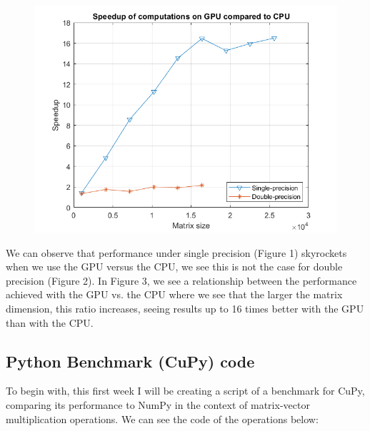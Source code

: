 \begin{center}
\begin{figure}[H]
\begin{minipage}[b]{0.32\linewidth}
\includegraphics[width=\linewidth]{Figures/Imagenes/speedup.png}
\caption{}
\end{minipage}
\end{figure}
\end{center}

\vspace{-1em}

We can observe that performance under single precision (Figure 1) skyrockets when we use the GPU versus the CPU, we see this is not the case for double precision (Figure 2). In Figure 3, we see a relationship between the performance achieved with the GPU vs. the CPU where we see that the larger the matrix dimension, this ratio increases, seeing results up to 16 times better with the GPU than with the CPU.



\subsection{Python Benchmark (CuPy) code}

To begin with, this first week I will be creating a script of a benchmark for CuPy, comparing its performance to NumPy in the context of matrix-vector multiplication operations. 
We can see the code of the operations below:

